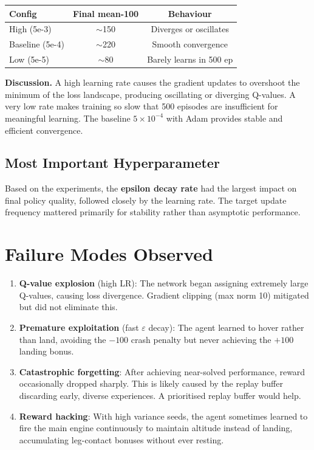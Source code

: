 \documentclass[11pt,a4paper]{article}
\begin{document}
\begin{center}
\begin{tabular}{lcc}
\toprule
Config & Final mean-100 & Behaviour \\
\midrule
High (5e-3)     & $\sim$150  & Diverges or oscillates \\
Baseline (5e-4) & $\sim$220  & Smooth convergence \\
Low (5e-5)      & $\sim$80   & Barely learns in 500 ep \\
\bottomrule
\end{tabular}
\end{center}

\textbf{Discussion.}
A high learning rate causes the gradient updates to overshoot the
minimum of the loss landscape, producing oscillating or diverging
Q-values.  A very low rate makes training so slow that 500 episodes
are insufficient for meaningful learning.  The baseline $5\times
10^{-4}$ with Adam provides stable and efficient convergence.

\subsection{Most Important Hyperparameter}
Based on the experiments, the \textbf{epsilon decay rate} had the
largest impact on final policy quality, followed closely by the
learning rate.  The target update frequency mattered primarily for
stability rather than asymptotic performance.

\section{Failure Modes Observed}

\begin{enumerate}
  \item \textbf{Q-value explosion} (high LR): The network began
        assigning extremely large Q-values, causing loss divergence.
        Gradient clipping (max norm 10) mitigated but did not
        eliminate this.

  \item \textbf{Premature exploitation} (fast $\varepsilon$ decay):
        The agent learned to hover rather than land, avoiding the
        $-100$ crash penalty but never achieving the $+100$ landing
        bonus.

  \item \textbf{Catastrophic forgetting}: After achieving near-solved
        performance, reward occasionally dropped sharply.  This is
        likely caused by the replay buffer discarding early, diverse
        experiences.  A prioritised replay buffer would help.

  \item \textbf{Reward hacking}: With high variance seeds, the agent
        sometimes learned to fire the main engine continuously to
        maintain altitude instead of landing, accumulating leg-contact
        bonuses without ever resting.
\end{enumerate}
\end{document}
